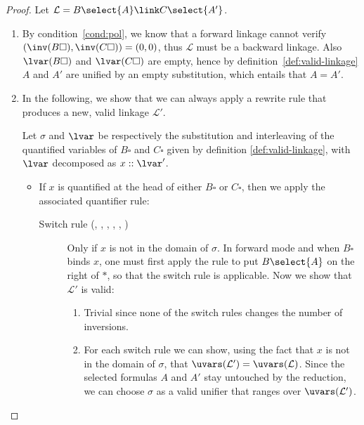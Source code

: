 \begin{proof}
  Let $\mathcal{L} = B\select{A} \link C\select{A'}$.\\
  \begin{enumerate}
    \setlength{\itemsep}{1em}
    \item By condition~\ref{cond:pol}, we know that a forward linkage cannot
    verify $(\inv(B\square), \inv(C\square)) = (0,0)$, thus $\mathcal{L}$ must
    be a backward linkage. Also $\lvar(B\square)$ and $\lvar(C\square)$ are
    empty, hence by definition~\ref{def:valid-linkage} $A$ and $A'$ are unified
    by an empty substitution, which entails that $A = A'$.

    \item In the following, we show that we can always apply a rewrite rule that
    produces a new, valid linkage $\mathcal{L'}$.
    
    Let $\sigma$ and $\lvar$ be respectively the substitution and
    interleaving of the quantified variables of $B\square$ and $C\square$ given
    by definition \ref{def:valid-linkage}, with $\lvar$ decomposed as $x ::
    \lvar'$.
    
    \begin{itemize}
      \item If $x$ is quantified at the head of either $B\square$ or $C\square$,
        then we apply the associated quantifier rule:

        \begin{description}
          \item[Switch rule (, ,
          , , ,
          )] Only if $x$ is not in the domain of $\sigma$. In
          forward mode and when $B\square$ binds $x$, one must first apply the
          rule  to put $B\select{A}$ on the right of $\ast$, so
          that the switch rule is applicable. Now we show that $\mathcal{L'}$ is
          valid:

          \begin{enumerate}
            \setlength{\itemsep}{0.8em}
            \renewcommand{\labelenumii}{\theenumii}
            \renewcommand{\theenumii}{\arabic{enumii}.}

            \item Trivial since none of the switch rules changes the number of
            inversions.

            \item For each switch rule we can show, using the fact that $x$ is
            not in the domain of $\sigma$, that $\uvars(\mathcal{L'}) =
            \uvars(\mathcal{L})$. Since the selected formulas $A$ and $A'$ stay
            untouched by the reduction, we can choose $\sigma$ as a valid
            unifier that ranges over $\uvars(\mathcal{L'})$.
            

\end{enumerate}
\end{description}
\end{itemize}
\end{enumerate}
\end{proof}

